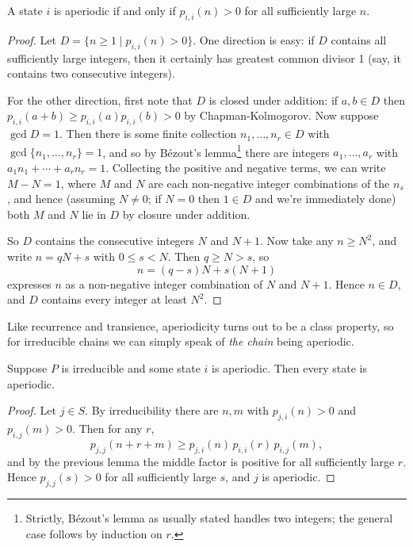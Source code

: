 \documentclass[a4paper]{scrartcl}
\begin{document}
\begin{lemma}
	A state $i$ is aperiodic if and only if $p_{i, i}(n) > 0$ for all sufficiently large $n$.
\end{lemma}
\begin{proof}
	Let $D = \{n \geq 1 \mid p_{i, i}(n) > 0\}$. One direction is easy: if $D$ contains all sufficiently large integers, then it certainly has greatest common divisor 1 (say, it contains two consecutive integers).

	For the other direction, first note that $D$ is closed under addition: if $a, b \in D$ then $p_{i, i}(a + b) \geq p_{i,i}(a) p_{i, i}(b) > 0$ by Chapman-Kolmogorov. Now suppose $\gcd D = 1$. Then there is some finite collection $n_1, \dots, n_r \in D$ with $\gcd\{n_1, \dots, n_r\} = 1$, and so by Bézout's lemma\footnote{Strictly, Bézout's lemma as usually stated handles two integers; the general case follows by induction on $r$.} there are integers $a_1, \dots, a_r$ with $a_1 n_1 + \cdots + a_r n_r = 1$. Collecting the positive and negative terms, we can write $M - N = 1$, where $M$ and $N$ are each non-negative integer combinations of the $n_s$, and hence (assuming $N \neq 0$; if $N = 0$ then $1 \in D$ and we're immediately done) both $M$ and $N$ lie in $D$ by closure under addition.

	So $D$ contains the consecutive integers $N$ and $N + 1$. Now take any $n \geq N^2$, and write $n = qN + s$ with $0 \leq s < N$. Then $q \geq N > s$, so
	$$
	n = (q - s)N + s(N + 1)
	$$
	expresses $n$ as a non-negative integer combination of $N$ and $N + 1$. Hence $n \in D$, and $D$ contains every integer at least $N^2$.
\end{proof}

Like recurrence and transience, aperiodicity turns out to be a class property, so for irreducible chains we can simply speak of \emph{the chain} being aperiodic.

\begin{lemma}
	Suppose $P$ is irreducible and some state $i$ is aperiodic. Then every state is aperiodic.
\end{lemma}
\begin{proof}
	Let $j \in S$. By irreducibility there are $n, m$ with $p_{j, i}(n) > 0$ and $p_{i, j}(m) > 0$. Then for any $r$,
	$$
	p_{j, j}(n + r + m) \geq p_{j, i}(n) \, p_{i, i}(r) \, p_{i, j}(m),
	$$
	and by the previous lemma the middle factor is positive for all sufficiently large $r$. Hence $p_{j, j}(s) > 0$ for all sufficiently large $s$, and $j$ is aperiodic.
\end{proof}
\end{document}
